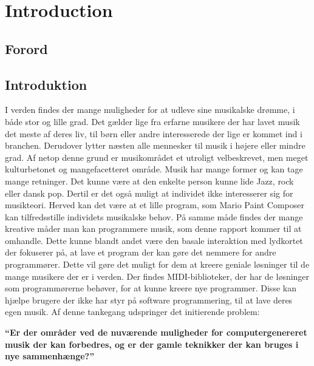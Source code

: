 \chapter{Introduction}

\section{Forord}

\section{Introduktion}

I verden findes der mange muligheder for at udleve sine musikalske drømme, i både stor og lille grad. Det gælder lige fra erfarne musikere der har lavet musik det meste af deres liv, til børn eller andre interesserede der lige er kommet ind i branchen. Derudover lytter næsten alle mennesker til musik i højere eller mindre grad. Af netop denne grund er musikområdet et utroligt velbeskrevet, men meget kulturbetonet og mangefacetteret område. 
Musik har mange former og kan tage mange retninger. Det kunne være at den enkelte person kunne lide Jazz, rock eller dansk pop. Dertil er det også muligt at individet ikke interesserer sig for musikteori. Herved kan det være at et lille program, som Mario Paint Composer kan tilfredsstille individets musikalske behov. På samme måde findes der mange kreative måder man kan programmere musik, som denne rapport kommer til at omhandle. Dette kunne blandt andet være den basale interaktion med lydkortet der fokuserer på, at lave et program der kan gøre det nemmere for andre programmører. Dette vil gøre det muligt for dem at kreere geniale løsninger til de mange musikere der er i verden. Der findes MIDI-biblioteker, der har de løsninger som programmørerne behøver, for at kunne kreere nye programmer. Disse kan hjælpe brugere der ikke har styr på software programmering, til at lave deres egen musik. Af denne tankegang udspringer det initierende problem:

\textbf{“Er der områder ved de nuværende muligheder for computergenereret musik der kan forbedres, og er der gamle teknikker der kan bruges i nye sammenhænge?”}
